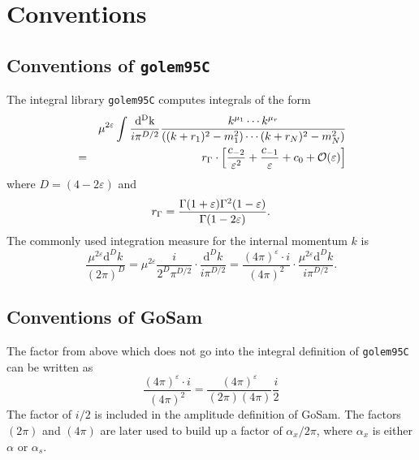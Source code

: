 \documentclass[11pt,a4paper]{refrep}
\newcommand{\gosamversion}{{2{.}0}}
\newcommand{\gosamv}[1][\gosamversion]{{\sc GoSam}\xspace}
\newcommand{\golemVC}{{\tt golem95C}\xspace}
\newcommand{\diff}[1][{}]{{\mathrm{d}}^{#1}\!}
\newcommand{\nn}{\nonumber}
\begin{document}
\appendix

\chapter{Conventions}
\label{sec:conventions}

\section{Conventions of \golemVC}
The integral library \golemVC{} computes integrals of the form
\begin{eqnarray}
&&\mu^{2\varepsilon}\int\frac{\mathrm{d^D k}}{i\pi^{D/2}}\frac{k^{\mu_1}\cdots k^{\mu_r}}{%
((k+r_1)^2-m_1^2)\cdots(k+r_N)^2-m_N^2)}\nn\\
&=&r_\Gamma\cdot\left[\frac{c_{-2}}{\varepsilon^2}+\frac{c_{-1}}{\varepsilon}+c_0
+{\mathcal{O}}(\varepsilon)\right]
\end{eqnarray}
where $D=(4-2\varepsilon)$ and
\begin{equation}
r_\Gamma=\frac{\Gamma(1+\varepsilon)\Gamma^2(1-\varepsilon)}{%
   \Gamma(1-2\varepsilon)}.
\end{equation}
The commonly used integration measure for the internal momentum $k$ is
\begin{equation}
\frac{\mu^{2\varepsilon}\diff[D]k}{(2\pi)^D}
=\mu^{2\varepsilon}\frac{i}{2^D\pi^{D/2}}\cdot\frac{{\mathrm d}^Dk}{i\pi^{D/2}}
=\frac{(4\pi)^\varepsilon \cdot i}{(4\pi)^2}\cdot%
 \frac{\mu^{2\varepsilon}{\mathrm d}^Dk}{i\pi^{D/2}}.
\end{equation}

\section{Conventions of \gosamv}
The factor from above which does not go into the integral definition of
\golemVC{} can be written as
\begin{equation}
\frac{(4\pi)^\varepsilon \cdot i}{(4\pi)^2}=
\frac{(4\pi)^\varepsilon}{(2\pi)(4\pi)}\frac{i}{2}
\end{equation}
The factor of $i/2$ is included in the amplitude definition of \gosamv{}.
The factors $(2\pi)$ and $(4\pi)$ are later used to build up a factor of
$\alpha_x/2\pi$, where $\alpha_x$ is either $\alpha$ or $\alpha_s$.
\end{document}
